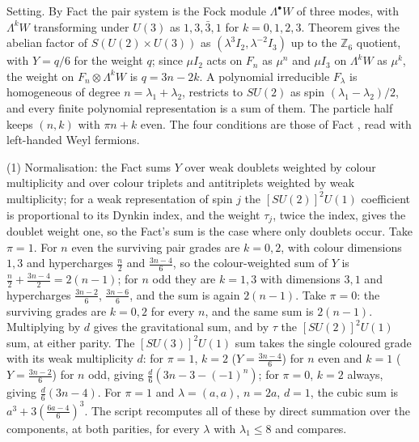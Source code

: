Setting. By Fact  the pair system is the Fock module $\Lambda^{\bullet}W$ of three modes, with $\Lambda^{k}W$ transforming under $U(3)$ as $1, 3, \bar{3}, 1$ for $k = 0, 1, 2, 3$. Theorem  gives the abelian factor of $S(U(2) \times U(3))$ as $(\lambda^{3}I_{2}, \lambda^{-2}I_{3})$ up to the $\mathbb{Z}_{6}$ quotient, with $Y = q/6$ for the weight $q$; since $\mu I_{2}$ acts on $F_{n}$ as $\mu^{n}$ and $\mu I_{3}$ on $\Lambda^{k}W$ as $\mu^{k}$, the weight on $F_{n} \otimes \Lambda^{k}W$ is $q = 3n - 2k$. A polynomial irreducible $F_{\lambda}$ is homogeneous of degree $n = \lambda_{1} + \lambda_{2}$, restricts to $SU(2)$ as spin $(\lambda_{1} - \lambda_{2})/2$, and every finite polynomial representation is a sum of them. The particle half keeps $(n, k)$ with $\pi n + k$ even. The four conditions are those of Fact , read with left-handed Weyl fermions.

(1) Normalisation: the Fact sums $Y$ over weak doublets weighted by colour multiplicity and over colour triplets and antitriplets weighted by weak multiplicity; for a weak representation of spin $j$ the $[SU(2)]^{2}U(1)$ coefficient is proportional to its Dynkin index, and the weight $\tau_{j}$, twice the index, gives the doublet weight one, so the Fact's sum is the case where only doublets occur. Take $\pi = 1$. For $n$ even the surviving pair grades are $k = 0, 2$, with colour dimensions $1, 3$ and hypercharges $\tfrac{n}{2}$ and $\tfrac{3n - 4}{6}$, so the colour-weighted sum of $Y$ is $\tfrac{n}{2} + \tfrac{3n - 4}{2} = 2(n - 1)$; for $n$ odd they are $k = 1, 3$ with dimensions $3, 1$ and hypercharges $\tfrac{3n - 2}{6}$, $\tfrac{3n - 6}{6}$, and the sum is again $2(n - 1)$. Take $\pi = 0$: the surviving grades are $k = 0, 2$ for every $n$, and the same sum is $2(n - 1)$. Multiplying by $d$ gives the gravitational sum, and by $\tau$ the $[SU(2)]^{2}U(1)$ sum, at either parity. The $[SU(3)]^{2}U(1)$ sum takes the single coloured grade with its weak multiplicity $d$: for $\pi = 1$, $k = 2$ ($Y = \tfrac{3n-4}{6}$) for $n$ even and $k = 1$ ($Y = \tfrac{3n - 2}{6}$) for $n$ odd, giving $\tfrac{d}{6}(3n - 3 - (-1)^{n})$; for $\pi = 0$, $k = 2$ always, giving $\tfrac{d}{6}(3n - 4)$. For $\pi = 1$ and $\lambda = (a, a)$, $n = 2a$, $d = 1$, the cubic sum is $a^{3} + 3(\tfrac{6a - 4}{6})^{3}$. The script recomputes all of these by direct summation over the components, at both parities, for every $\lambda$ with $\lambda_{1} \le 8$ and compares.

